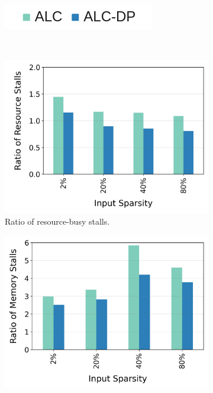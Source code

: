 \begin{figure}[htbp]
  \centering
  \begin{subfigure}{4 cm}
    \centering
    \includegraphics[width=\textwidth]{Figures/Evaluations/Legend.png}
  \end{subfigure}\\
  
  \begin{subfigure}{.49\textwidth}
    \centering
    \includegraphics[width=\textwidth, height=.28\textheight]{Figures/Evaluations/if_then_else_many_scatter_resource_stalls.png}
    \caption{Ratio of resource-busy stalls.}
    \label{fig:if-then-else-many-scatter-resource-stalls}
  \end{subfigure}%
  \begin{subfigure}{.49\textwidth}
        \centering
    \includegraphics[width=\textwidth, height=.28\textheight]{Figures/Evaluations/if_then_else_many_scatter_mem_stalls.png}

\end{subfigure}
\end{figure}
